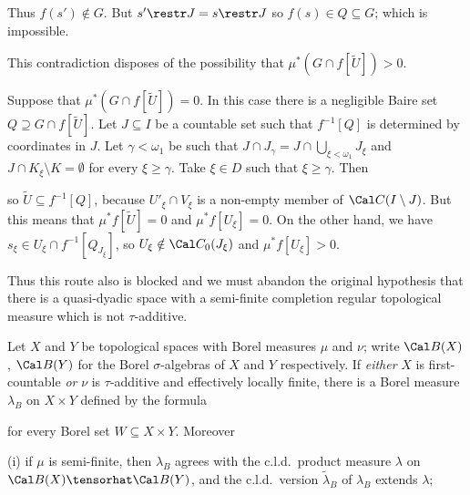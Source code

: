 {Thus $f(s')\notin G$.   But $s'\restr J=s\restr J$ so 
$f(s)\in Q\subseteq G$;  which is impossible.

This contradiction disposes of the possibility that 
$\mu^*(G\cap f[\tilde U])>0$.

\medskip

 Suppose that $\mu^*(G\cap f[\tilde U])=0$.   In this
case there is a negligible Baire set $Q\supseteq G\cap f[\tilde U]$.
Let $J\subseteq I$ be a countable set such that $f^{-1}[Q]$ is
determined
by coordinates in $J$.   Let $\gamma<\omega_1$ be such that 
$J\cap J_{\gamma}=J\cap\bigcup_{\xi<\omega_1}J_{\xi}$ and 
$J\cap K_{\xi}\setminus K=\emptyset$ for every $\xi\ge\gamma$.   Take $\xi\in D$ 
such that $\xi\ge\gamma$.   Then


\noindent so $\tilde U\subseteq f^{-1}[Q]$, because $U'_{\xi}\cap V_{\xi}$ is a 
non-empty member of $\Cal C(I\setminus J)$.   But this
means that $\mu^*f[\tilde U]=0$ and $\mu^*f[U_{\xi}]=0$.   On the other
hand, we have $s_{\xi}\in U_{\xi}\cap f^{-1}[Q_{J_{\xi}}]$, so
$U_{\xi}\notin\Cal C_0(J_{\xi})$ and $\mu^*f[U_{\xi}]>0$.\ \Bang

Thus this route also is blocked and we must abandon the original
hypothesis that there is a quasi-dyadic space with a semi-finite
completion regular topological measure which is not $\tau$-additive.
}%

 Let $X$ and $Y$ be topological spaces with
Borel measures $\mu$ and $\nu$;  write $\Cal B(X)$, $\Cal B(Y)$ for the
Borel $\sigma$-algebras of $X$ and $Y$ respectively.   If {\it either}
$X$ is first-countable {\it or} $\nu$ is $\tau$-additive and effectively
locally finite, there is a Borel measure $\lambda_B$ on $X\times Y$
defined by the formula


\noindent for every Borel set $W\subseteq X\times Y$.   Moreover

\quad(i) if $\mu$ is semi-finite, then $\lambda_B$ agrees with the
c.l.d.\ product measure $\lambda$ on $\Cal B(X)\tensorhat\Cal B(Y)$, and
the c.l.d.\ version $\tilde\lambda_B$ of $\lambda_B$ extends $\lambda$;

